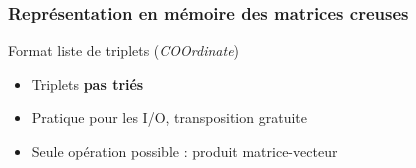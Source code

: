 \documentclass[xcolor={x11names,svgnames}]{beamer}
\begin{document}
\begin{frame}[fragile]
  \frametitle{Représentation en mémoire des matrices creuses}
  
  \begin{alertblock}{Format \og liste de triplets\fg{} (\emph{COOrdinate})}
    \begin{itemize}
    \item Triplets \textbf{pas triés}
    \item Pratique pour les I/O, transposition gratuite 
    \item Seule opération possible : produit matrice-vecteur 
    \end{itemize}
  \end{alertblock}


\end{frame}
\end{document}
